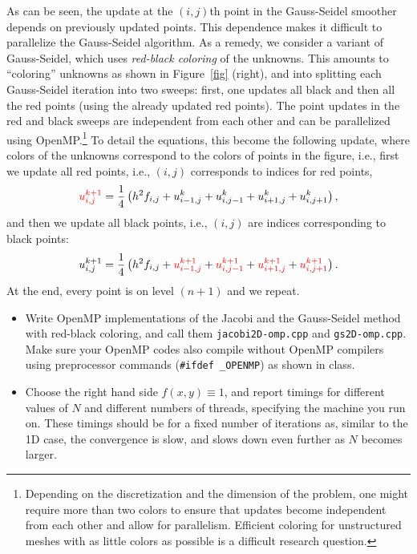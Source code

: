 \documentclass[12pt]{article}
\begin{document}
\begin{enumerate}
  As can be seen, the update at the $(i,j)$th point in the Gauss-Seidel
  smoother depends on previously updated points. This dependence makes
  it difficult to parallelize the Gauss-Seidel algorithm. As a remedy,
  we consider a variant of Gauss-Seidel, which uses \emph{red-black
    coloring} of the unknowns. This amounts to ``coloring'' unknowns as
  shown in Figure~\ref{fig} (right), and into splitting each
  Gauss-Seidel iteration into two sweeps: first, one updates all black
  and then all the red points (using the already updated red
  points). The point updates in the red and black sweeps are
  independent from each other and can be
  parallelized using OpenMP.\footnote{Depending on the discretization and the
    dimension of the problem, one might require more than two colors
    to ensure that updates become independent from each other and
    allow for parallelism. Efficient coloring for unstructured meshes
    with as little colors as possible is a difficult research
    question.}
  To detail the equations, this become the following update, where colors of the
  unknowns correspond to the colors of points in the figure, i.e.,
  first we update all red points, i.e., $(i,j)$ corresponds to indices
  for red points,
  \begin{equation*}
  \textcolor{red}{u_{i,j}^{k+1}} = \frac{1}{4}\left(h^2 f_{i,j} + u^{k}_{i-1,j}+
  u^{k}_{i,j-1}+ u^k_{i+1,j}+ u^k_{i,j+1} \right),
  \end{equation*}
  and then we update all black points, i.e.,  $(i,j)$ are indices
  corresponding to black points:
  \begin{equation*}
    \textcolor{black}{u_{i,j}^{k+1}} = \frac{1}{4}\left(h^2 f_{i,j} + \textcolor{red}{u^{k+1}_{i-1,j}}+
    \textcolor{red}{u^{k+1}_{i,j-1}}+ \textcolor{red}{u^{k+1}_{i+1,j}}+
    \textcolor{red}{u^{k+1}_{i,j+1}} \right).
  \end{equation*}
  At the end, every point is on level $(n+1)$ and we repeat.
    \begin{itemize}
  \item Write OpenMP implementations of the Jacobi and the
    Gauss-Seidel method with red-black coloring, and call them
    \texttt{jacobi2D-omp.cpp} and \texttt{gs2D-omp.cpp}. Make sure your
    OpenMP codes also compile without OpenMP compilers using
    preprocessor commands (\texttt{\#ifdef \_OPENMP}) as shown in
    class.
  \item Choose the right hand side $f(x,y)\equiv 1$, and report
    timings for different values of $N$ and different numbers of
    threads, specifying the machine you run on. These timings should
    be for a fixed number of iterations as, similar to the 1D case,
    the convergence is slow, and slows down even further as $N$
    becomes larger.
  \end{itemize}
\end{enumerate}
\end{document}
